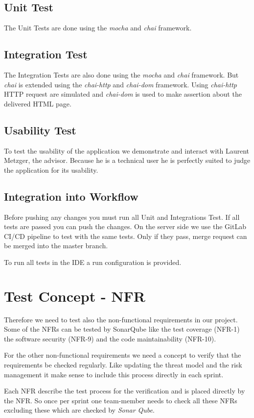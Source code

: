 \subsection{Unit Test}
The Unit Tests are done using the \textit{mocha} and \textit{chai} framework.

\subsection{Integration Test}
The Integration Tests are also done using the \textit{mocha} and \textit{chai} framework.
But \textit{chai} is extended using the \textit{chai-http} and \textit{chai-dom} framework.
Using \textit{chai-http} HTTP request are simulated and \textit{chai-dom} is used to make assertion about the delivered HTML page.

\subsection{Usability Test}
To test the usability of the application we demonstrate and interact with Laurent Metzger, the advisor.
Because he is a technical user he is perfectly suited to judge the application for its usability.

\subsection{Integration into Workflow}
Before pushing any changes you must run all Unit and Integrations Test.
If all tests are passed you can push the changes.
On the server side we use the GitLab CI/CD pipeline to test with the same tests.
Only if they pass, merge request can be merged into the master branch.

To run all tests in the IDE a run configuration is provided.


\section{Test Concept - NFR}
Therefore we need to test also the non-functional requirements in our project. Some of the NFRs can be tested by SonarQube like the test coverage (NFR-1) the software security (NFR-9) and the code maintainability (NFR-10).

For the other non-functional requirements we need a concept to verify that the requirements be checked regularly. Like updating the threat model and the risk management it make sense to include this process directly in each sprint.

Each NFR describe the test process for the verification and is placed directly by the NFR. So once per sprint one team-member needs to check all these NFRs excluding these which are checked by \textit{Sonar Qube}.